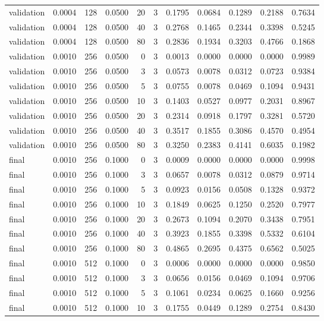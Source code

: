 \begin{tabular}{lrrrrrrrrrr}
validation & 0.0004 & 128 & 0.0500 & 20 & 3 & 0.1795 & 0.0684 & 0.1289 & 0.2188 & 0.7634 \\
validation & 0.0004 & 128 & 0.0500 & 40 & 3 & 0.2768 & 0.1465 & 0.2344 & 0.3398 & 0.5245 \\
validation & 0.0004 & 128 & 0.0500 & 80 & 3 & 0.2836 & 0.1934 & 0.3203 & 0.4766 & 0.1868 \\
validation & 0.0010 & 256 & 0.0500 & 0 & 3 & 0.0013 & 0.0000 & 0.0000 & 0.0000 & 0.9989 \\
validation & 0.0010 & 256 & 0.0500 & 3 & 3 & 0.0573 & 0.0078 & 0.0312 & 0.0723 & 0.9384 \\
validation & 0.0010 & 256 & 0.0500 & 5 & 3 & 0.0755 & 0.0078 & 0.0469 & 0.1094 & 0.9431 \\
validation & 0.0010 & 256 & 0.0500 & 10 & 3 & 0.1403 & 0.0527 & 0.0977 & 0.2031 & 0.8967 \\
validation & 0.0010 & 256 & 0.0500 & 20 & 3 & 0.2314 & 0.0918 & 0.1797 & 0.3281 & 0.5720 \\
validation & 0.0010 & 256 & 0.0500 & 40 & 3 & 0.3517 & 0.1855 & 0.3086 & 0.4570 & 0.4954 \\
validation & 0.0010 & 256 & 0.0500 & 80 & 3 & 0.3250 & 0.2383 & 0.4141 & 0.6035 & 0.1982 \\
final & 0.0010 & 256 & 0.1000 & 0 & 3 & 0.0009 & 0.0000 & 0.0000 & 0.0000 & 0.9998 \\
final & 0.0010 & 256 & 0.1000 & 3 & 3 & 0.0657 & 0.0078 & 0.0312 & 0.0879 & 0.9714 \\
final & 0.0010 & 256 & 0.1000 & 5 & 3 & 0.0923 & 0.0156 & 0.0508 & 0.1328 & 0.9372 \\
final & 0.0010 & 256 & 0.1000 & 10 & 3 & 0.1849 & 0.0625 & 0.1250 & 0.2520 & 0.7977 \\
final & 0.0010 & 256 & 0.1000 & 20 & 3 & 0.2673 & 0.1094 & 0.2070 & 0.3438 & 0.7951 \\
final & 0.0010 & 256 & 0.1000 & 40 & 3 & 0.3923 & 0.1855 & 0.3398 & 0.5332 & 0.6104 \\
final & 0.0010 & 256 & 0.1000 & 80 & 3 & 0.4865 & 0.2695 & 0.4375 & 0.6562 & 0.5025 \\
final & 0.0010 & 512 & 0.1000 & 0 & 3 & 0.0006 & 0.0000 & 0.0000 & 0.0000 & 0.9850 \\
final & 0.0010 & 512 & 0.1000 & 3 & 3 & 0.0656 & 0.0156 & 0.0469 & 0.1094 & 0.9706 \\
final & 0.0010 & 512 & 0.1000 & 5 & 3 & 0.1061 & 0.0234 & 0.0625 & 0.1660 & 0.9256 \\
final & 0.0010 & 512 & 0.1000 & 10 & 3 & 0.1755 & 0.0449 & 0.1289 & 0.2754 & 0.8430 \\

\end{tabular}

